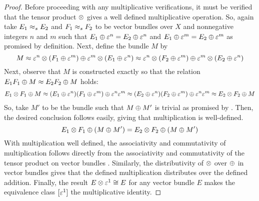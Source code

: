 \documentclass[../../sean_thesis.tex]{subfiles}
\begin{document}
\begin{proof}
Before proceeding with any multiplicative verifications, it must be verified that the tensor product $\otimes$ gives a well defined multiplicative operation. So, again take $E_1 \approx_s E_2$ and $F_1 \approx_s F_2$ to be vector bundles over $X$ and nonnegative integers $n$ and $m$ such that $E_1 \oplus \varepsilon^{n} = E_2 \oplus \varepsilon^{n}$ and $E_1 \oplus \varepsilon^{m} = E_2 \oplus \varepsilon^{m}$ as promised by definition. Next, define the bundle $M$ by
\begin{equation*}
	M \approx \varepsilon^{n} \otimes (F_1 \oplus \varepsilon^{m}) 
	\oplus \varepsilon^{m} \otimes (E_1 \oplus \varepsilon^{n})
	  \approx \varepsilon^{n} \otimes (F_2 \oplus \varepsilon^{m}) 
	\oplus \varepsilon^{m} \otimes (E_2 \oplus \varepsilon^{n})
\end{equation*}
Next, observe that $M$ is constructed exactly so that the relation $E_1F_1 \oplus M \approx E_2F_2 \oplus M$ holds:
\begin{align*}
	E_1 \otimes F_1 \oplus M
	\approx (E_1 \oplus \varepsilon^{n})(F_1 \oplus \varepsilon^{m}) \oplus \varepsilon^{n}\varepsilon^{m}
	\approx (E_2 \oplus \varepsilon^{n})(F_2 \oplus \varepsilon^{m}) \oplus \varepsilon^{n}\varepsilon^{m}
	\approx E_2 \otimes F_2 \oplus M
\end{align*}
So, take $M'$ to be the bundle such that $M \oplus M'$ is trivial as promised by . Then, the desired conclusion follows easily, giving that multiplication is well-defined.
\begin{equation*}
	E_1 \otimes F_1 \oplus (M \oplus M') = E_2 \otimes F_2 \oplus (M \oplus M')
\end{equation*}
With multiplication well defined, the associativity and commutativity of multiplication follows directly from the associativity and commutativity of the tensor product on vector bundles . Similarly, the distributivity of $\otimes$ over $\oplus$ in vector bundles  gives that the defined multiplication distributes over the defined addition. Finally, the result $E \otimes \varepsilon^{1} \cong E$ for any vector bundle $E$  makes the equivalence class $[\varepsilon^{1}]$ the multiplicative identity.
	
		
	\end{proof}
\end{document}
